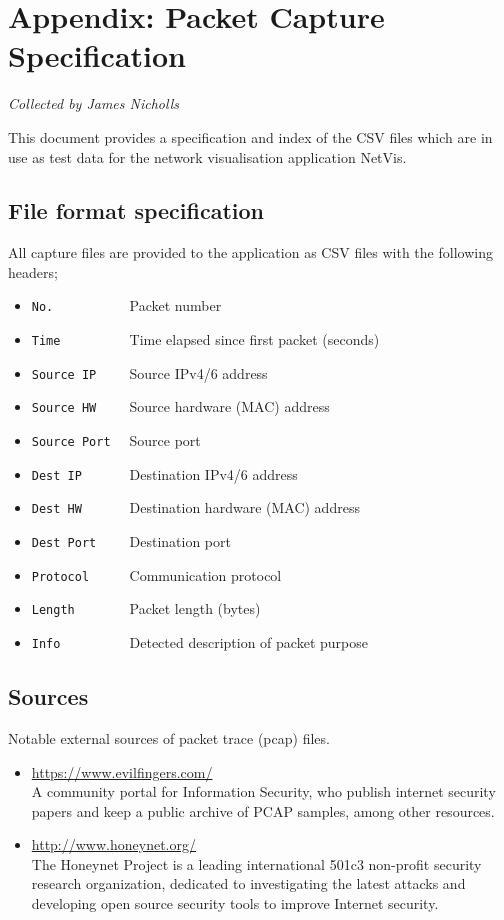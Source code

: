 \documentclass[12pt,a4paper]{article}
\begin{document}
	\newpage
	\section*{Appendix: Packet Capture Specification}
	
	\textit{Collected by James Nicholls}
	
	This document provides a specification and index of the CSV files
	which are in use as test data for the network visualisation
	application NetVis.
	
	\subsection*{File format specification}
	All capture files are provided to the application as CSV files
	with the following headers;
	
	\begin{itemize}
		\setlength{\itemsep}{0pt}
		\item \verb!No.          ! Packet number
		\item \verb!Time         ! Time elapsed since first packet (seconds)
		\item \verb!Source IP    ! Source IPv4/6 address
		\item \verb!Source HW    ! Source hardware (MAC) address
		\item \verb!Source Port  ! Source port
		\item \verb!Dest IP      ! Destination IPv4/6 address
		\item \verb!Dest HW      ! Destination hardware (MAC) address
		\item \verb!Dest Port    ! Destination port
		\item \verb!Protocol     ! Communication protocol
		\item \verb!Length       ! Packet length (bytes)
		\item \verb!Info         ! Detected description of packet purpose
	\end{itemize}
	
	\subsection*{Sources}
	
	Notable external sources of packet trace (pcap) files.
	
	\begin{itemize}
		\item \url{https://www.evilfingers.com/} \\
		A community portal for Information Security, who publish
		internet security papers and keep a public archive of
		PCAP samples, among other resources.
		
		\item \url{http://www.honeynet.org/} \\
		The Honeynet Project is a leading international 501c3
		non-profit security research organization, dedicated to
		investigating the latest attacks and developing open source
		security tools to improve Internet security.
	\end{itemize}
	
\end{document}
